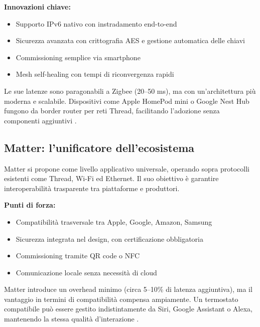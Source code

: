 \textbf{Innovazioni chiave:}
\begin{itemize}
    \item Supporto IPv6 nativo con instradamento end-to-end
    \item Sicurezza avanzata con crittografia AES e gestione automatica delle chiavi
    \item Commissioning semplice via smartphone
    \item Mesh self-healing con tempi di riconvergenza rapidi
\end{itemize}

Le sue latenze sono paragonabili a Zigbee (20–50 ms), ma con un’architettura più moderna e scalabile. Dispositivi come Apple HomePod mini o Google Nest Hub fungono da border router per reti Thread, facilitando l’adozione senza componenti aggiuntivi \cite{thread-spec}.

\subsection{Matter: l’unificatore dell’ecosistema}

Matter si propone come livello applicativo universale, operando sopra protocolli esistenti come Thread, Wi-Fi ed Ethernet. Il suo obiettivo è garantire interoperabilità trasparente tra piattaforme e produttori.

\textbf{Punti di forza:}
\begin{itemize}
    \item Compatibilità trasversale tra Apple, Google, Amazon, Samsung
    \item Sicurezza integrata nel design, con certificazione obbligatoria
    \item Commissioning tramite QR code o NFC
    \item Comunicazione locale senza necessità di cloud
\end{itemize}

Matter introduce un overhead minimo (circa 5–10\% di latenza aggiuntiva), ma il vantaggio in termini di compatibilità compensa ampiamente. Un termostato compatibile può essere gestito indistintamente da Siri, Google Assistant o Alexa, mantenendo la stessa qualità d’interazione \cite{MatterWhitePaper}.

